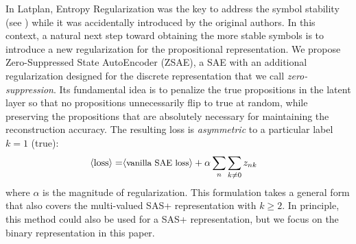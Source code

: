 In Latplan, Entropy Regularization was the key to address the symbol stability (see )
while it was accidentally introduced by the original authors.
In this context, a natural next step toward obtaining the more stable symbols is to introduce a new regularization
for the propositional representation.
We propose Zero-Suppressed State AutoEncoder (ZSAE),
a SAE with an additional regularization designed for the discrete representation that we call \emph{zero-suppression}.
% 
Its fundamental idea is to penalize the
true propositions in the latent layer so that no propositions unnecessarily flip to true at random,
while preserving the propositions that are absolutely necessary for maintaining the reconstruction accuracy.
% 
The resulting loss is 
\emph{asymmetric} to a particular label $k=1$ (true):
\begin{align*}
 \brackets{\text{loss}} = & \brackets{\text{\small vanilla SAE loss}} + \alpha \sum_n \sum_{k\not=0} z_{nk} %
\end{align*}
where $\alpha$ is the magnitude of regularization.
This formulation takes a general form
that also covers the multi-valued SAS+ representation with $k\geq 2$.
In principle, this method could also be used for a SAS+ representation,
but we focus on the binary representation in this paper.

